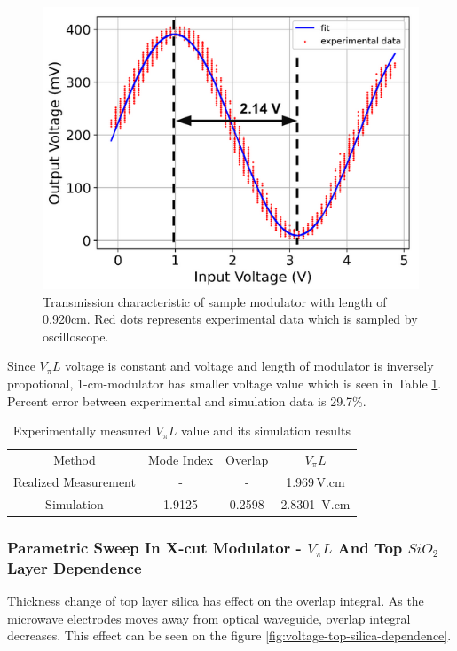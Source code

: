     \begin{figure}[h!]
        \centering
        \includegraphics[width=0.55\linewidth]{girish_transmission_characteristic.PNG}
        \caption{Transmission characteristic of sample modulator with length of 0.920cm. Red dots represents experimental data which is sampled by oscilloscope.}
        \label{fig:experimental-pi}
    \end{figure}

    Since $V_\pi L $ voltage is constant and voltage and length of modulator is inversely propotional, 1-cm-modulator has smaller voltage value which is seen in Table \ref{tab:experimental-comparision}. Percent error between experimental and simulation data is 29.7\%.
    
    \begin{table}[h]
        \centering
        \begin{tabular}{|c|c|c|c|}
            \cline{1-4}
            Method & Mode Index & Overlap & $V_\pi L$ \\ \cline{1-4}
            Realized Measurement & - & - & 1.969\,V.cm         \\ \cline{1-4}
            Simulation & 1.9125 & 0.2598 &  2.8301 \,V.cm   \\ \cline{1-4}
        \end{tabular}
        \caption{Experimentally measured $V_\pi L$ value and its simulation results}
        \label{tab:experimental-comparision}
    \end{table}


    
    \subsubsection{Parametric Sweep In X-cut Modulator - $V_\pi L $ And Top $SiO_2$ Layer Dependence}

    Thickness change of top layer silica has effect on the overlap integral. As the microwave electrodes moves away from optical waveguide, overlap integral decreases. This effect can be seen on the figure \ref{fig:voltage-top-silica-dependence}. 
    
